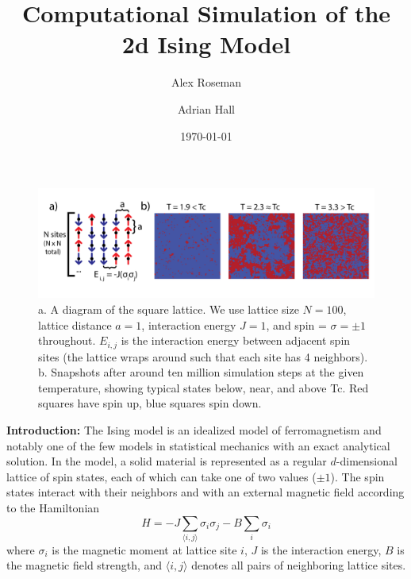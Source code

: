\documentclass[letter,scriptaddress,twocolumn, prl,nofootinbib]{revtex4}
\begin{document}
\title{Computational Simulation of the 2d Ising Model}

\author{Alex Roseman}
\author{Adrian Hall}
\date{\today}

\begin{abstract}

\end{abstract}

\maketitle

\begin{figure}[t]
	\begin{center}
		\includegraphics[width=1\textwidth]{figs/fig1.png}
		\caption{a. A diagram of the square lattice. We use lattice size $N = 100$, lattice distance $a = 1$, interaction energy $J = 1$, and spin = $\sigma = \pm 1$ throughout. $E_{i, j}$ is the interaction energy between adjacent spin sites (the lattice wraps around such that each site has 4 neighbors). b. Snapshots after around ten million simulation steps at the given temperature, showing typical states below, near, and above Tc. Red squares have spin up, blue squares spin down.}
		\label{fig:fig1}
	\end{center}
\end{figure}

\textbf{Introduction:} The Ising model is an idealized model of ferromagnetism and notably one of the few models in statistical mechanics with an exact analytical solution. In the model, a solid material is represented as a regular $d$-dimensional lattice of spin states, each of which can take one of two values ($\pm 1$). The spin states interact with their neighbors and with an external magnetic field according to the Hamiltonian
\begin{equation}
	\label{eq:hamiltonian}
	H = -J \sum_{\langle i, j \rangle} \sigma_i \sigma_j - B \sum_i \sigma_i
\end{equation}
where $\sigma_i$ is the magnetic moment at lattice site $i$, $J$ is the interaction energy, $B$ is the magnetic field strength, and $\langle i, j \rangle$ denotes all pairs of neighboring lattice sites.
\end{document}
